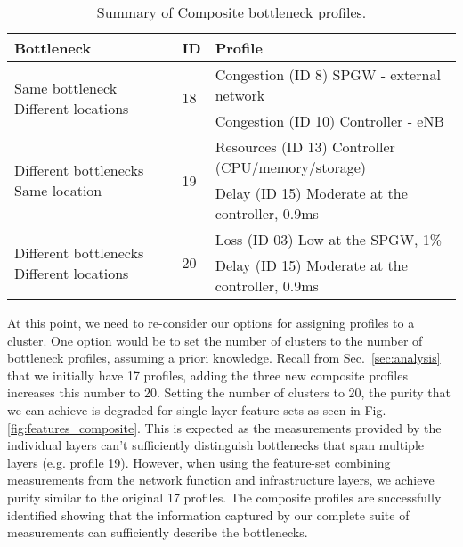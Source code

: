 \documentclass[journal,comsoc]{IEEEtran}
\begin{document}
% 
\begin{table}
\small
\begin{tabular}{ | m{2.7cm} | m{0.4cm} | m{4.4cm} | } 
\hline
\textbf{Bottleneck} & \textbf{ID} & \textbf{Profile} \\
\hline
\multirow{2}{2.7cm}{Same bottleneck \newline Different locations} & \multirow{2}{0.4cm}{18}
& Congestion (ID 8) \newline SPGW - external network \\ \cline{3-3}
& & Congestion (ID 10) \newline Controller - eNB \\ \hline
\multirow{2}{2.7cm}{Different bottlenecks \newline Same location} & \multirow{2}{0.4cm}{19}
& Resources (ID 13) \newline Controller (CPU/memory/storage) \\ \cline{3-3}
& & Delay (ID 15) \newline Moderate at the controller, 0.9ms \\ \hline
\multirow{2}{2.7cm}{Different bottlenecks \newline Different locations} & \multirow{2}{0.4cm}{20}
& Loss (ID 03) \newline Low at the SPGW, 1\% \\ \cline{3-3}
& & Delay (ID 15) \newline Moderate at the controller, 0.9ms \\ \hline
\end{tabular}
\vspace{1mm}
\caption{Summary of Composite bottleneck profiles.}
\vspace{-8mm}
\label{table:3}
\end{table}

%
At this point, we need to re-consider our options for assigning profiles to a cluster. One option would be to set the number of clusters to the number of bottleneck profiles, assuming a priori knowledge. 
Recall from Sec.~\ref{sec:analysis} that we initially have 17 profiles, adding the three new composite profiles increases this number to 20. 
Setting the number of clusters to 20, the purity that we can achieve is degraded for single layer feature-sets as seen in Fig. \ref{fig:features_composite}.
This is expected as the measurements provided by the individual layers can't sufficiently distinguish bottlenecks that span multiple layers (e.g. profile 19).
However, when using the feature-set combining measurements from the network function and infrastructure layers, we achieve purity similar to the original 17 profiles.
The composite profiles are successfully identified showing that the information captured by our complete suite of measurements can sufficiently describe the bottlenecks.
\end{document}
